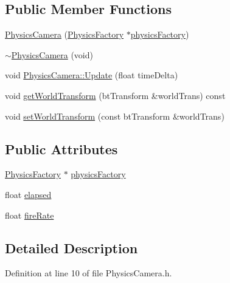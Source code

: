 \subsection*{Public Member Functions}
\begin{DoxyCompactItemize}
\item 
\hyperlink{class_b_g_e_1_1_physics_camera_a29bd6735e14f44fcbe7de1ab716cb7ae}{Physics\-Camera} (\hyperlink{class_b_g_e_1_1_physics_factory}{Physics\-Factory} $\ast$\hyperlink{class_b_g_e_1_1_physics_camera_ad096e2c076c89efb09733aaaf707a7c0}{physics\-Factory})
\item 
\hyperlink{class_b_g_e_1_1_physics_camera_a1ac76af9188c2b30050f91f9b8aeca22}{$\sim$\-Physics\-Camera} (void)
\item 
void \hyperlink{class_b_g_e_1_1_physics_camera_a8bb31d92243ddb5004a838f02d7045a0}{Physics\-Camera\-::\-Update} (float time\-Delta)
\item 
void \hyperlink{class_b_g_e_1_1_physics_camera_a7accdb10940590ee57442f4f976ae3fc}{get\-World\-Transform} (bt\-Transform \&world\-Trans) const 
\item 
void \hyperlink{class_b_g_e_1_1_physics_camera_a567b01fa847d73b6a6132d2dd457a383}{set\-World\-Transform} (const bt\-Transform \&world\-Trans)
\end{DoxyCompactItemize}
\subsection*{Public Attributes}
\begin{DoxyCompactItemize}
\item 
\hyperlink{class_b_g_e_1_1_physics_factory}{Physics\-Factory} $\ast$ \hyperlink{class_b_g_e_1_1_physics_camera_ad096e2c076c89efb09733aaaf707a7c0}{physics\-Factory}
\item 
float \hyperlink{class_b_g_e_1_1_physics_camera_acc9a82193c98fbb3585924c59d195f69}{elapsed}
\item 
float \hyperlink{class_b_g_e_1_1_physics_camera_aa57b37765c35f6e1e00b790b4292e719}{fire\-Rate}
\end{DoxyCompactItemize}


\subsection{Detailed Description}


Definition at line 10 of file Physics\-Camera.\-h.



